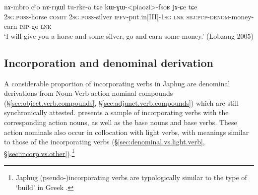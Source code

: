\begin{exe}
\ex \label{ex:kWGWpiaozifsoR}
\gll nɤ-mbro cʰo nɤ-rŋɯl tu-rke-a tɕe kɯ-ɣɯ-<piaozi>-fsoʁ jɤ-ɕe tɕe \\
\textsc{2sg}.\textsc{poss}-horse \textsc{comit} \textsc{2sg}.\textsc{poss}-silver \textsc{ipfv}-put.in[III]-\textsc{1sg} \textsc{lnk} \textsc{sbj}:\textsc{pcp}-\textsc{denom}-money-earn \textsc{imp}-go \textsc{lnk} \\
\glt `I will give you a horse and some silver, go and earn some money.' (Lobzang 2005)
\end{exe}

\subsection{Incorporation and denominal derivation} \label{sec:incorp.denom}
A considerable proportion of incorporating verbs in Japhug are denominal derivations from Noun-Verb action nominal compounds (§\ref{sec:object.verb.compounds}, §\ref{sec:adjunct.verb.compounds}) which are still synchronically attested.  presents a sample of incorporating verbs with the corresponding action nouns, as well as the base nouns and base verbs. These action nominals also occur in collocation with light verbs, with meanings similar to those of the incorporating verbs (§\ref{sec:denominal.vs.light.verb}, §\ref{sec:incorp.vs.other}).\footnote{Japhug (pseudo-)incorporating verbs are typologically similar to the type of  `build' in Greek \citep{benveniste66incorp}. 
}

